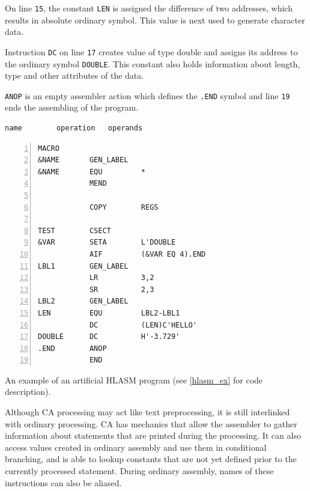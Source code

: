 On line \verb|15|, the constant \verb|LEN| is assigned the difference of two addresses, which results in absolute ordinary symbol. This value is next used to generate character data.

Instruction \verb|DC| on line \verb|17| creates value of type double and assigns its address to the ordinary symbol \verb|DOUBLE|. This constant also holds information about length, type and other attributes of the data.  

\verb|ANOP| is an empty assembler action which defines the \verb|.END| symbol and line \verb|19| ends the assembling of the program. 



\begin{listing}[t]
    \begin{verbatim}
name        operation   operands
    \end{verbatim}
	\begin{Verbatim}[numbers=left]
            MACRO                   
&NAME       GEN_LABEL
&NAME       EQU         *
            MEND
        
            COPY        REGS
        
TEST        CSECT
&VAR        SETA        L'DOUBLE
            AIF         (&VAR EQ 4).END
LBL1        GEN_LABEL
            LR          3,2
            SR          2,3
LBL2        GEN_LABEL
LEN         EQU         LBL2-LBL1
            DC          (LEN)C'HELLO'
DOUBLE      DC          H'-3.729'
.END        ANOP
            END
	\end{Verbatim} 
	\caption{An example of an artificial HLASM program (see \cref{hlasm_ex} for code description).}
	\label{lst:example}
\end{listing}

\vspace{5mm}

Although CA processing may act like text preprocessing, it is still interlinked with ordinary processing. CA has mechanics that allow the assembler to gather information about statements that are printed during the processing. It can also access values created in ordinary assembly and use them in conditional branching, and is able to lookup constants that are not yet defined prior to the currently processed statement. During ordinary assembly, names of these instructions can also be aliased.


